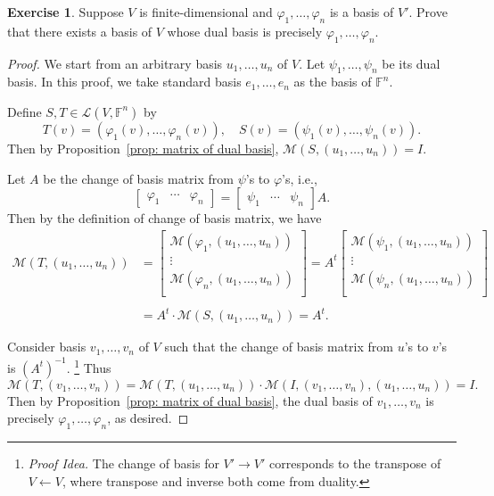\documentclass[colorlinks]{tufte-handout}
\theoremstyle{plain} %
\theoremstyle{definition}
\newtheorem{exer}[thm]{Exercise}
\theoremstyle{remark}
\def\idea{\textit{\color[rgb]{0,0,.55}Proof Idea. }}
\newcommand{\bra}[1]{\mathopen{}\left(#1\right)}
\renewcommand{\phi}{\varphi}
\newcommand{\F}{\mathbb{F}}
\renewcommand{\L}{\mathcal{L}}
\newcommand{\M}{\mathcal{M}}
\renewcommand{\intercal}{t}
\begin{document}
\begin{exer}
	Suppose $V$ is finite-dimensional and $\phi_1,\dots,\phi_n$ is a basis of $V'$. Prove that there exists a basis of $V$ whose dual basis is precisely $\phi_1,\dots,\phi_n$.
\end{exer}
\begin{proof}
	We start from an arbitrary basis $u_1,\dots,u_n$ of $V$. Let $\psi_1,\dots,\psi_n$ be its dual basis. In this proof, we take standard basis $e_1,\dots,e_n$ as the basis of $\F^n$.
	
	Define $S,T\in\L\bra{V,\F^n}$ by
	\[T(v)=\bra{\phi_1(v),\dots,\phi_n(v)},\quad S(v)=\bra{\psi_1(v),\dots,\psi_n(v)}.\]
	Then by Proposition~\ref{prop: matrix of dual basis}, $\M\bra{S,\bra{u_1,\dots,u_n}}=I$.
	
	Let $A$ be the change of basis matrix from $\psi$'s to $\phi$'s, i.e.,
	\[\begin{bmatrix}\phi_1&\cdots&\phi_n\end{bmatrix}=\begin{bmatrix}\psi_1&\cdots&\psi_n\end{bmatrix}A.\]
	Then by the definition of change of basis matrix, we have
	\begin{align*}
		\M\bra{T,\bra{u_1,\dots,u_n}}&=\begin{bmatrix}
			\M\bra{\phi_1,\bra{u_1,\dots,u_n}}\\
			\vdots\\
			\M\bra{\phi_n,\bra{u_1,\dots,u_n}}\\
		\end{bmatrix}
		=A^\intercal\begin{bmatrix}
			\M\bra{\psi_1,\bra{u_1,\dots,u_n}}\\
			\vdots\\
			\M\bra{\psi_n,\bra{u_1,\dots,u_n}}\\
		\end{bmatrix}\\\\
		&=A^\intercal\cdot\M\bra{S,\bra{u_1,\dots,u_n}}=A^\intercal.
	\end{align*}

	Consider basis $v_1,\dots,v_n$ of $V$ such that the change of basis matrix from $u$'s to $v$'s is $\bra{A^\intercal}^{-1}$.%
    \footnote{\idea The change of basis for $V'\to V'$ corresponds to the transpose of $V\leftarrow V$, where transpose and inverse both come from duality.}
	Thus
	\[\M\bra{T,\bra{v_1,\dots,v_n}}=\M\bra{T,\bra{u_1,\dots,u_n}}\cdot\M\bra{I,\bra{v_1,\dots,v_n},\bra{u_1,\dots,u_n}}=I.\]
	Then by Proposition~\ref{prop: matrix of dual basis}, the dual basis of $v_1,\dots,v_n$ is precisely $\phi_1,\dots,\phi_n$, as desired.
\end{proof}
\end{document}
